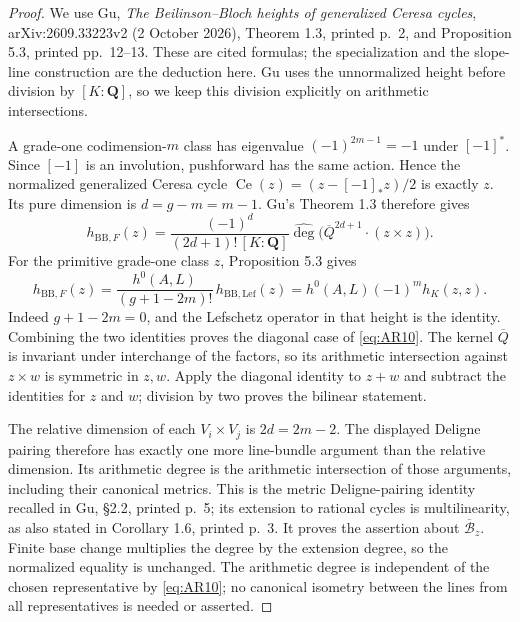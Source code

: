 \documentclass[11pt,a4paper]{article}
\begin{document}
\begin{proof}
We use Gu, \emph{The Beilinson--Bloch heights of generalized Ceresa
cycles}, arXiv:2609.33223v2 (2 October 2026), Theorem 1.3, printed p.~2,
and Proposition 5.3, printed pp.~12--13. These are cited formulas;
the specialization and the slope-line construction are the deduction
here. Gu uses the unnormalized height before division by $[K:\mathbf Q]$,
so we keep this division explicitly on arithmetic intersections.

A grade-one codimension-$m$ class has eigenvalue $(-1)^{2m-1}=-1$
under $[-1]^*$. Since $[-1]$ is an involution, pushforward has the same
action. Hence the normalized generalized Ceresa cycle
$\operatorname{Ce}(z)=(z-[-1]_*z)/2$ is exactly $z$.
Its pure dimension is $d=g-m=m-1$. Gu's Theorem 1.3 therefore gives
\[
 h_{\mathrm{BB},F}(z)=
 \frac{(-1)^d}{(2d+1)!\,[K:\mathbf Q]}
 \widehat{\deg}\bigl(\overline Q^{2d+1}\cdot(z\times z)\bigr).
\]
For the primitive grade-one class $z$, Proposition 5.3 gives
\[
 h_{\mathrm{BB},F}(z)=
 \frac{h^0(A,L)}{(g+1-2m)!}\,h_{\mathrm{BB},\mathrm{Lef}}(z)
 =h^0(A,L)(-1)^m h_K(z,z).
\]
Indeed $g+1-2m=0$, and the Lefschetz operator in that height is the
identity. Combining the two identities proves the diagonal case of
\eqref{eq:AR10}. The kernel $\overline Q$ is invariant under interchange
of the factors, so its arithmetic intersection against $z\times w$
is symmetric in $z,w$. Apply the diagonal identity to $z+w$ and
subtract the identities for $z$ and $w$; division by two proves the
bilinear statement.

The relative dimension of each $V_i\times V_j$ is $2d=2m-2$.
The displayed Deligne pairing therefore has exactly one more line-bundle
argument than the relative dimension. Its arithmetic degree is the
arithmetic intersection of those arguments, including their canonical
metrics. This is the metric Deligne-pairing identity recalled in Gu,
\S2.2, printed p.~5; its extension to rational cycles is multilinearity,
as also stated in Corollary 1.6, printed p.~3. It proves the assertion
about $\overline{\mathcal B}_z$. Finite base change multiplies the degree
by the extension degree, so the normalized equality is unchanged.
The arithmetic degree is independent of the chosen representative by
\eqref{eq:AR10}; no canonical isometry between the lines from all
representatives is needed or asserted.


\end{proof}
\end{document}
